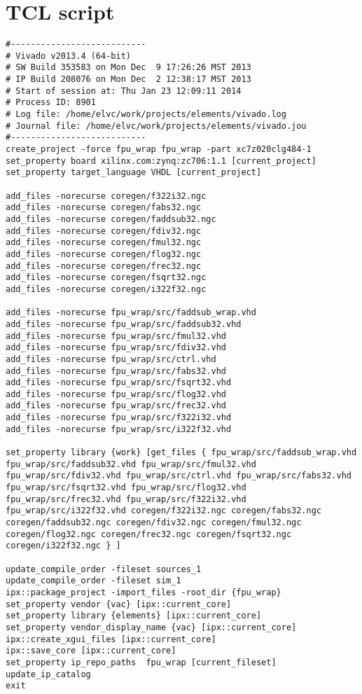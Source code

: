 \documentclass[conference]{IEEEtran}
\begin{document}
\section{TCL script}
\begin{lstlisting}
#---------------------------
# Vivado v2013.4 (64-bit)
# SW Build 353583 on Mon Dec  9 17:26:26 MST 2013
# IP Build 208076 on Mon Dec  2 12:38:17 MST 2013
# Start of session at: Thu Jan 23 12:09:11 2014
# Process ID: 8901
# Log file: /home/elvc/work/projects/elements/vivado.log
# Journal file: /home/elvc/work/projects/elements/vivado.jou
#---------------------------
create_project -force fpu_wrap fpu_wrap -part xc7z020clg484-1
set_property board xilinx.com:zynq:zc706:1.1 [current_project]
set_property target_language VHDL [current_project]

add_files -norecurse coregen/f322i32.ngc
add_files -norecurse coregen/fabs32.ngc
add_files -norecurse coregen/faddsub32.ngc
add_files -norecurse coregen/fdiv32.ngc
add_files -norecurse coregen/fmul32.ngc
add_files -norecurse coregen/flog32.ngc
add_files -norecurse coregen/frec32.ngc
add_files -norecurse coregen/fsqrt32.ngc
add_files -norecurse coregen/i322f32.ngc

add_files -norecurse fpu_wrap/src/faddsub_wrap.vhd
add_files -norecurse fpu_wrap/src/faddsub32.vhd
add_files -norecurse fpu_wrap/src/fmul32.vhd
add_files -norecurse fpu_wrap/src/fdiv32.vhd
add_files -norecurse fpu_wrap/src/ctrl.vhd
add_files -norecurse fpu_wrap/src/fabs32.vhd
add_files -norecurse fpu_wrap/src/fsqrt32.vhd
add_files -norecurse fpu_wrap/src/flog32.vhd
add_files -norecurse fpu_wrap/src/frec32.vhd
add_files -norecurse fpu_wrap/src/f322i32.vhd
add_files -norecurse fpu_wrap/src/i322f32.vhd

set_property library {work} [get_files { fpu_wrap/src/faddsub_wrap.vhd fpu_wrap/src/faddsub32.vhd fpu_wrap/src/fmul32.vhd fpu_wrap/src/fdiv32.vhd fpu_wrap/src/ctrl.vhd fpu_wrap/src/fabs32.vhd fpu_wrap/src/fsqrt32.vhd fpu_wrap/src/flog32.vhd fpu_wrap/src/frec32.vhd fpu_wrap/src/f322i32.vhd fpu_wrap/src/i322f32.vhd coregen/f322i32.ngc coregen/fabs32.ngc coregen/faddsub32.ngc coregen/fdiv32.ngc coregen/fmul32.ngc coregen/flog32.ngc coregen/frec32.ngc coregen/fsqrt32.ngc coregen/i322f32.ngc } ]

update_compile_order -fileset sources_1
update_compile_order -fileset sim_1
ipx::package_project -import_files -root_dir {fpu_wrap}
set_property vendor {vac} [ipx::current_core]
set_property library {elements} [ipx::current_core]
set_property vendor_display_name {vac} [ipx::current_core]
ipx::create_xgui_files [ipx::current_core]
ipx::save_core [ipx::current_core]
set_property ip_repo_paths  fpu_wrap [current_fileset]
update_ip_catalog
exit 

\end{lstlisting}
\end{document}
